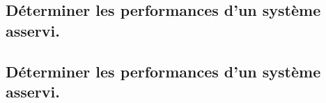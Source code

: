 \documentclass[10pt,fleqn]{book}
\newcommand{\repRel}{../..}
\newcommand{\repStyle}{\repRel/Style}
\newcommand{\td}{fichier_td}
\newcommand{\repExos}{\repRel/ExercicesCompetences}
\newcommand{\repExo}{dossier}
\begin{document}
\renewcommand{\repExo}{\repExos/C2_MettreEnOeuvreDemarche/C2_02_DiagrammeBode/511_Divers}
\renewcommand{\td}{511_Divers}
\graphicspath{{\repStyle/png/}{\repExo/images/}}


\subsection{Déterminer les performances d'un système asservi.} 

\subsection{Déterminer les performances d'un système asservi.} 

\renewcommand{\repExo}{\repExos/C2_MettreEnOeuvreDemarche/C2_03_PerformancesSLCI/501_Divers}
\renewcommand{\td}{501_Divers}
\graphicspath{{\repStyle/png/}{\repExo/images/}}


\renewcommand{\repExo}{\repExos/C2_MettreEnOeuvreDemarche/C2_03_PerformancesSLCI/509_Divers}
\renewcommand{\td}{509_Divers}
\graphicspath{{\repStyle/png/}{\repExo/images/}}


\renewcommand{\repExo}{\repExos/C2_MettreEnOeuvreDemarche/C2_03_PerformancesSLCI_Precision/63_BancHydraulique}
\renewcommand{\td}{63_BancHydraulique}
\graphicspath{{\repStyle/png/}{\repExo/images/}}


\renewcommand{\repExo}{\repExos/C2_MettreEnOeuvreDemarche/C2_03_PerformancesSLCI_Precision/64_EPAS}
\renewcommand{\td}{64_EPAS}
\graphicspath{{\repStyle/png/}{\repExo/images/}}


\renewcommand{\repExo}{\repExos/C2_MettreEnOeuvreDemarche/C2_03_PerformancesSLCI_Precision/73_Bassin}
\renewcommand{\td}{73_Bassin}
\graphicspath{{\repStyle/png/}{\repExo/images/}}


\renewcommand{\repExo}{\repExos/C2_MettreEnOeuvreDemarche/C2_03_PerformancesSLCI_Stabilite/61_Hemostase}
\renewcommand{\td}{61_Hemostase}
\graphicspath{{\repStyle/png/}{\repExo/images/}}


\renewcommand{\repExo}{\repExos/C2_MettreEnOeuvreDemarche/C2_03_PerformancesSLCI_Stabilite/62_Palettisation}
\renewcommand{\td}{62_Palettisation}
\graphicspath{{\repStyle/png/}{\repExo/images/}}


\renewcommand{\repExo}{\repExos/C2_MettreEnOeuvreDemarche/C2_03_PerformancesSLCI_Stabilite/63_BancHydraulique}
\renewcommand{\td}{63_BancHydraulique}
\graphicspath{{\repStyle/png/}{\repExo/images/}}

\end{document}

